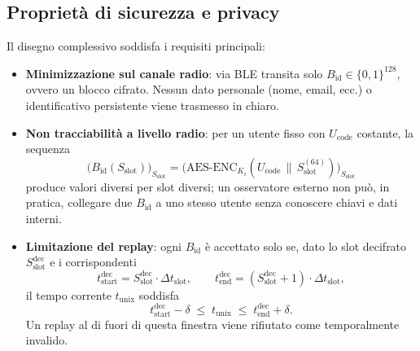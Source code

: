 \documentclass[a4paper,11pt]{article}
\begin{document}
\subsection{Proprietà di sicurezza e privacy}

Il disegno complessivo soddisfa i requisiti principali:

\begin{itemize}
  \item \textbf{Minimizzazione sul canale radio}: via BLE transita solo
        \(B_{\text{id}} \in \{0,1\}^{128}\), ovvero un blocco cifrato. Nessun dato personale
        (nome, email, ecc.) o identificativo persistente viene trasmesso in chiaro.
  \item \textbf{Non tracciabilità a livello radio}: per un utente fisso con \(U_{\text{code}}\)
        costante, la sequenza
        \[
          \bigl(B_{\text{id}}(S_{\text{slot}})\bigr)_{S_{\text{slot}}}
          = \bigl(
          \mathrm{AES\text{-}ENC}_{K_i}(U_{\text{code}} \,\|\, S_{\text{slot}}^{(64)})
          \bigr)_{S_{\text{slot}}}
        \]
        produce valori diversi per slot diversi; un osservatore esterno non può, in pratica,
        collegare due \(B_{\text{id}}\) a uno stesso utente senza conoscere chiavi e dati interni.
  \item \textbf{Limitazione del replay}: ogni \(B_{\text{id}}\) è accettato solo se, dato lo slot
        decifrato \(S_{\text{slot}}^{\text{dec}}\) e i corrispondenti
        \[
          t_{\text{start}}^{\text{dec}}
          = S_{\text{slot}}^{\text{dec}} \cdot \Delta t_{\text{slot}}, \qquad
          t_{\text{end}}^{\text{dec}}
          = (S_{\text{slot}}^{\text{dec}} + 1) \cdot \Delta t_{\text{slot}},
        \]
        il tempo corrente \(t_{\text{unix}}\) soddisfa
        \[
          t_{\text{start}}^{\text{dec}} - \delta
          \;\le\;
          t_{\text{unix}}
          \;\le\;
          t_{\text{end}}^{\text{dec}} + \delta.
        \]
        Un replay al di fuori di questa finestra viene rifiutato come temporalmente invalido.


\end{itemize}
\end{document}
